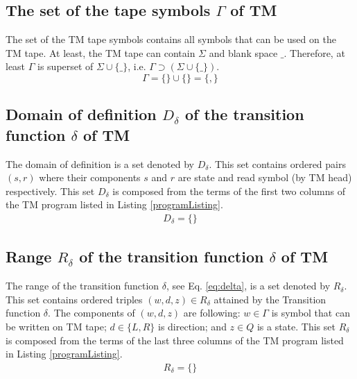 \documentclass[12pt, a4paper]{report}
\begin{document}
	\subsection{The set of the tape symbols $ \Gamma $ of TM}
	The set of the TM tape symbols contains all symbols that can be used on the TM tape. At least, the TM tape can contain $ \Sigma $ and blank space $ \_ $. Therefore, at least $ \Gamma $ is superset of $ \Sigma \cup \{\_\} $, i.e. $ \Gamma \supset (\Sigma \cup \{\_\}) $.
		\begin{equation} \label{eq:Gamma}
			\Gamma = \{
			\} \cup \{
			\} = \{
			,
			\}
		\end{equation}
	
	\subsection{Domain of definition $ D_{\delta} $ of the transition function $ \delta $ of TM}
	The domain of definition is a set denoted by $ D_{\delta} $. This set contains ordered pairs $ (s, r) $ where  their components $ s $ and $ r $ are state and read symbol (by TM head) respectively. This set $ D_{\delta} $ is composed from the terms of the first two columns of the TM program listed in Listing \ref{programListing}.
	\begin{equation}
	\begin{aligned}
	\label{eq:domain}
		D_{\delta} = \{
		\}
	\end{aligned}
	\end{equation}

	\subsection{Range $ R_{\delta} $ of the transition function $ \delta $ of TM}
	The range of the transition function $ \delta $, see Eq. \ref{eq:delta}, is a set denoted by $ R_{\delta} $. This set contains ordered triples $ (w, d, z) \in R_{\delta} $ attained by the Transition function $ \delta $. The components of $ (w, d, z) $ are following: $ w \in \Gamma $ is symbol that can be written on TM tape; $ d \in \{L, R\} $ is direction; and $ z \in Q $ is a state.
	This set $ R_{\delta} $ is composed from the terms of the last three columns of the TM program listed in Listing \ref{programListing}.
	\begin{equation}
	\label{eq:range}
	\begin{aligned}
	R_{\delta} = \{
		\}
	\end{aligned}
	\end{equation}
	
\end{document}
